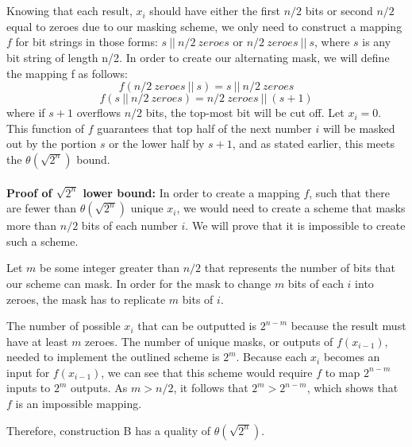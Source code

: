 \documentclass[11pt]{article}
\begin{document}
\\
\\Knowing that each result, \(x_i\) should have either the first \(n/2\) bits or second \(n/2\) equal to zeroes due to our masking scheme, we only need to construct a mapping \(f\) for bit strings in those forms: \(s\ ||\ n/2\ zeroes \) or \(n/2\ zeroes\ ||\ s\), where \(s\) is any bit string of length n/2.  In order to create our alternating mask, we will define the mapping f as follows:
\[f(n/2\ zeroes\ ||\ s) = s\ ||\ n/2\ zeroes\]
\[f(s\ ||\ n/2\ zeroes) = n/2\ zeroes\ ||\ (s + 1)\]
where if \(s+1\) overflows \(n/2\) bits, the top-most bit will be cut off.  Let \(x_i=0\).  
This function of \(f\) guarantees that top half of the next number \(i\) will be masked out by the portion \(s\) or the lower half by \(s+1\), and as stated earlier, this meets the \(\theta(\sqrt{2^n})\) bound. 
\\
\\ \textbf{Proof of \(\sqrt{2^n}\) lower bound:} In order to create a mapping \(f\), such that there are fewer than \(\theta(\sqrt{2^n})\) unique \(x_i\), we would need to create a scheme that masks more than \(n/2\) bits of each number \(i\). We will prove that it is impossible to create such a scheme. 

Let \(m\) be some integer greater than \(n/2\) that represents the number of bits that our scheme can mask. In order for the mask to change \(m\) bits of each \(i\) into zeroes, the mask has to replicate \(m\) bits of \(i\). 

The number of possible \(x_i\) that can be outputted is \(2^{n-m}\) because the result must have at least \(m\) zeroes. 
The number of unique masks, or outputs of \(f(x_{i-1})\), needed to implement the outlined scheme is \(2^m\). 
Because each \(x_i\) becomes an input for \(f(x_{i-1})\), we can see that this scheme would require \(f\) to map \(2^{n-m}\) inputs to \(2^m\) outputs.  As \(m > n/2\), it follows that \(2^m > 2^{n-m}\), which shows that \(f\) is an impossible mapping. 

Therefore, construction B has a quality of \(\theta(\sqrt{2^n})\). 
\end{document}
